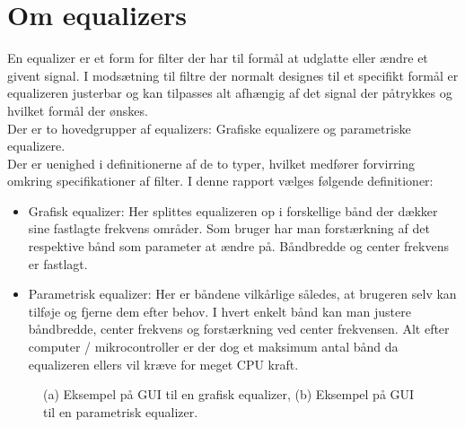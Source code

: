 \section{Om equalizers}\label{sec:equalizer}

En equalizer er et form for filter der har til formål at udglatte eller ændre et givent signal. I modsætning til filtre der normalt designes til et specifikt formål er equalizeren justerbar og kan tilpasses alt afhængig af det signal der påtrykkes og hvilket formål der ønskes.\\

Der er to hovedgrupper af equalizers: Grafiske equalizere og parametriske equalizere.\\
Der er uenighed i definitionerne af de to typer, hvilket medfører forvirring omkring specifikationer af filter. I denne rapport vælges følgende definitioner:

\begin{itemize}
	\item Grafisk equalizer: Her splittes equalizeren op i forskellige bånd der dækker sine fastlagte frekvens områder. Som bruger har man forstærkning af det respektive bånd som parameter at ændre på. Båndbredde og center frekvens er fastlagt.
	\item Parametrisk equalizer: Her er båndene vilkårlige således, at brugeren selv kan tilføje og fjerne dem efter behov. I hvert enkelt bånd kan man justere båndbredde, center frekvens og forstærkning ved center frekvensen. Alt efter computer / mikrocontroller er der dog et maksimum antal bånd da equalizeren ellers vil kræve for meget CPU kraft. 
\end{itemize}  

\begin{figure}[h]
	\centering
  	\caption{(a) Eksempel på GUI til en grafisk equalizer, (b) Eksempel på GUI til en parametrisk equalizer.\protect\footnotemark}
	\label{fig:om_eq}
\end{figure}
\FloatBlock

